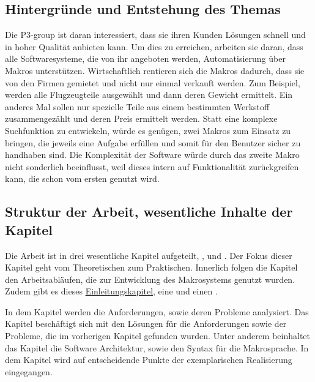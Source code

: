   \subsection{Hintergründe und Entstehung des Themas}
  \label{ssec:Hintergründe und Entstehung des Themas}
    Die P3-group ist daran interessiert, dass sie ihren Kunden Lösungen schnell und in hoher Qualität anbieten kann. Um dies zu erreichen, arbeiten sie daran, dass alle Softwaresysteme, die von ihr angeboten werden, Automatisierung über Makros unterstützen. Wirtschaftlich rentieren sich die Makros dadurch, dass sie von den Firmen gemietet und nicht nur einmal verkauft werden. Zum Beispiel, werden alle Flugzeugteile ausgewählt und dann deren Gewicht ermittelt. Ein anderes Mal sollen nur spezielle Teile aus einem bestimmten Werkstoff zusammengezählt und deren Preis ermittelt werden. Statt eine komplexe Suchfunktion zu entwickeln, würde es genügen, zwei Makros zum Einsatz zu bringen, die jeweils eine Aufgabe erfüllen und somit für den Benutzer sicher zu handhaben sind. Die Komplexität der Software würde durch das zweite Makro nicht sonderlich beeinflusst, weil dieses intern auf Funktionalität zurückgreifen kann, die schon vom ersten genutzt wird.

  \subsection{Struktur der Arbeit, wesentliche Inhalte der Kapitel}
  \label{ssec:Struktur der Arbeit, wesentliche Inhalte der Kapitel}
    Die Arbeit ist in drei wesentliche Kapitel aufgeteilt, ,  und . Der Fokus dieser Kapitel geht vom Theoretischen zum Praktischen. Innerlich folgen die Kapitel den Arbeitsabläufen, die zur Entwicklung des Makrosystems genutzt wurden. Zudem gibt es dieses \hyperref[sec:Einleitung]{Einleitungskapitel}, eine  und einen .

    In dem Kapitel  werden die Anforderungen, sowie deren Probleme analysiert. Das Kapitel  beschäftigt sich mit den Lösungen für die Anforderungen sowie der Probleme, die im vorherigen Kapitel gefunden wurden. Unter anderem beinhaltet das Kapitel die Software Architektur, sowie den Syntax für die Makrosprache. In dem Kapitel  wird auf entscheidende Punkte der exemplarischen Realisierung eingegangen.

